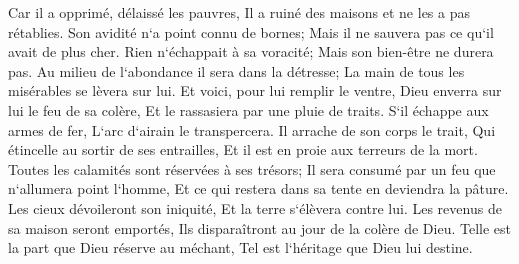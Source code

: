 \verse Car il a opprimé, délaissé les pauvres, Il a ruiné des maisons et ne les a pas rétablies. 
\verse Son avidité n`a point connu de bornes; Mais il ne sauvera pas ce qu`il avait de plus cher. 
\verse Rien n`échappait à sa voracité; Mais son bien-être ne durera pas. 
\verse Au milieu de l`abondance il sera dans la détresse; La main de tous les misérables se lèvera sur lui. 
\verse Et voici, pour lui remplir le ventre, Dieu enverra sur lui le feu de sa colère, Et le rassasiera par une pluie de traits. 
\verse S`il échappe aux armes de fer, L`arc d`airain le transpercera. 
\verse Il arrache de son corps le trait, Qui étincelle au sortir de ses entrailles, Et il est en proie aux terreurs de la mort. 
\verse Toutes les calamités sont réservées à ses trésors; Il sera consumé par un feu que n`allumera point l`homme, Et ce qui restera dans sa tente en deviendra la pâture. 
\verse Les cieux dévoileront son iniquité, Et la terre s`élèvera contre lui. 
\verse Les revenus de sa maison seront emportés, Ils disparaîtront au jour de la colère de Dieu. 
\verse Telle est la part que Dieu réserve au méchant, Tel est l`héritage que Dieu lui destine. 

